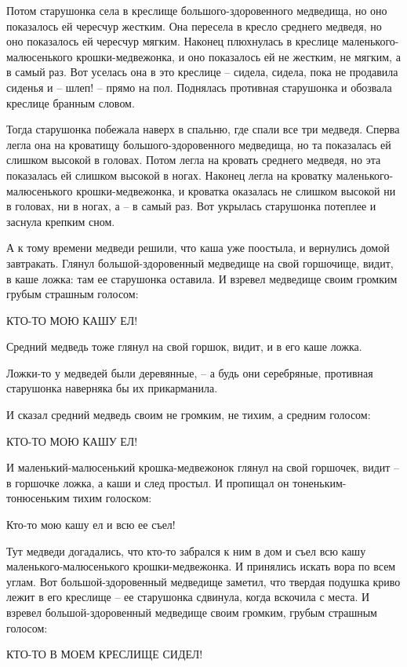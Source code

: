 \documentclass[12pt]{article}
\begin{document}
Потом старушонка села в креслище большого-здоровенного медведища, но оно показалось ей чересчур жестким. Она пересела в кресло среднего медведя, но оно показалось ей чересчур мягким. Наконец плюхнулась в креслице маленького-малюсенького крошки-медвежонка, и оно показалось ей не жестким, не мягким, а в самый раз. Вот уселась она в это креслице – сидела, сидела, пока не продавила сиденья и – шлеп! – прямо на пол. Поднялась противная старушонка и обозвала креслице бранным словом.

Тогда старушонка побежала наверх в спальню, где спали все три медведя. Сперва легла она на кроватищу большого-здоровенного медведища, но та показалась ей слишком высокой в головах. Потом легла на кровать среднего медведя, но эта показалась ей слишком высокой в ногах. Наконец легла на кроватку маленького-малюсенького крошки-медвежонка, и кроватка оказалась не слишком высокой ни в головах, ни в ногах, а – в самый раз. Вот укрылась старушонка потеплее и заснула крепким сном.

А к тому времени медведи решили, что каша уже поостыла, и вернулись домой завтракать. Глянул большой-здоровенный медведище на свой горшочище, видит, в каше ложка: там ее старушонка оставила. И взревел медведище своим громким грубым страшным голосом:

КТО-ТО МОЮ КАШУ ЕЛ!

Средний медведь тоже глянул на свой горшок, видит, и в его каше ложка.

Ложки-то у медведей были деревянные, – а будь они серебряные, противная старушонка наверняка бы их прикарманила.

И сказал средний медведь своим не громким, не тихим, а средним голосом:

КТО-ТО МОЮ КАШУ ЕЛ!

И маленький-малюсенький крошка-медвежонок глянул на свой горшочек, видит – в горшочке ложка, а каши и след простыл. И пропищал он тоненьким-тонюсеньким тихим голоском:

Кто-то мою кашу ел и всю ее съел!

Тут медведи догадались, что кто-то забрался к ним в дом и съел всю кашу маленького-малюсенького крошки-медвежонка. И принялись искать вора по всем углам. Вот большой-здоровенный медведище заметил, что твердая подушка криво лежит в его креслище – ее старушонка сдвинула, когда вскочила с места. И взревел большой-здоровенный медведище своим громким, грубым страшным голосом:

КТО-ТО В МОЕМ КРЕСЛИЩЕ СИДЕЛ!
\end{document}
